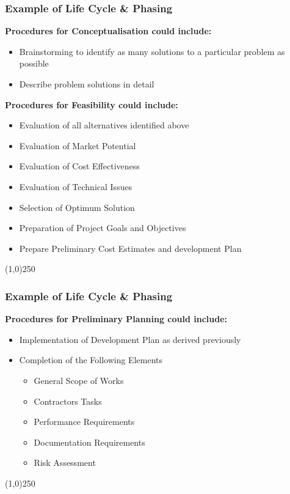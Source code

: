 \begin{frame}
\frametitle{Example of Life Cycle \& Phasing}
\textbf{Procedures for Conceptualisation could include:}\\
\begin{itemize}
	\item Brainstorming to identify as many solutions to a particular problem as possible
	\item Describe problem solutions in detail
\end{itemize}
\textbf{Procedures for Feasibility could include:}\\
\begin{itemize}
	\item Evaluation of all alternatives identified above
	\item Evaluation of Market Potential
	\item Evaluation of Cost Effectiveness
	\item Evaluation of Technical Issues
	\item Selection of Optimum Solution 
	\item Preparation of Project Goals and Objectives 
	\item Prepare Preliminary Cost Estimates and development Plan
\end{itemize}
\end{frame}
\begin{center}\line(1,0){250}\end{center}



\begin{frame}
\frametitle{Example of Life Cycle \& Phasing}
\textbf{Procedures for Preliminary Planning could include:}\\
\begin{itemize}
	\item Implementation of Development Plan as derived previously
	\item Completion of the Following Elements
	\begin{itemize}
		\item General Scope of Works
		\item Contractors Tasks
		\item Performance Requirements
		\item Documentation Requirements
		\item Risk Assessment
	\end{itemize}
\end{itemize}
\end{frame}
\begin{center}\line(1,0){250}\end{center}



